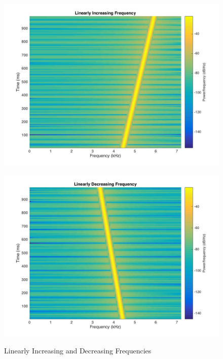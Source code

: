 \documentclass{article}
\begin{document}
\begin{figure}[!htb]
    \centering
    \begin{minipage}{.5\textwidth}
        \centering
        \includegraphics[width=1.0\linewidth, height=0.2\textheight]{part2li.jpg}

        \label{fig:prob1_6_2}
    \end{minipage}%
    \begin{minipage}{0.5\textwidth}
        \centering
        \includegraphics[width=1\linewidth, height=0.2\textheight]{part2ld.jpg}

        \label{fig:prob1_6_1}
    \end{minipage}
    \caption{Linearly Increasing and Decreasing Frequencies}
\end{figure}
\end{document}
